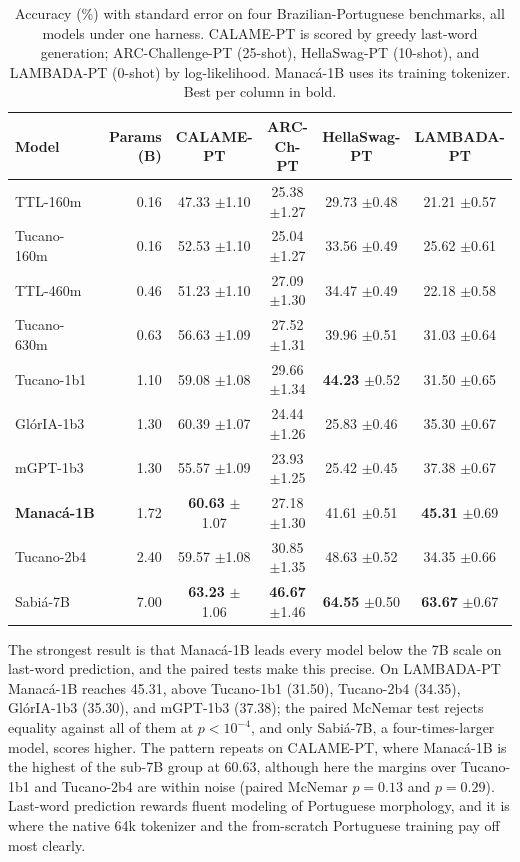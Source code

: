 \documentclass[11pt]{article}
\begin{document}
\begin{table}[t]
\centering
\caption{Accuracy (\%) with standard error on four Brazilian-Portuguese benchmarks,
all models under one harness. CALAME-PT is scored by greedy last-word generation;
ARC-Challenge-PT (25-shot), HellaSwag-PT (10-shot), and LAMBADA-PT (0-shot) by
log-likelihood. Manac\'a-1B uses its training tokenizer. Best per column in bold.}
\label{tab:main}
\small
\begin{tabular}{lrcccc}
\toprule
Model & Params (B) & CALAME-PT & ARC-Ch-PT & HellaSwag-PT & LAMBADA-PT \\
\midrule
TTL-160m       & 0.16 & 47.33 \tiny$\pm$1.10 & 25.38 \tiny$\pm$1.27 & 29.73 \tiny$\pm$0.48 & 21.21 \tiny$\pm$0.57 \\
Tucano-160m    & 0.16 & 52.53 \tiny$\pm$1.10 & 25.04 \tiny$\pm$1.27 & 33.56 \tiny$\pm$0.49 & 25.62 \tiny$\pm$0.61 \\
TTL-460m       & 0.46 & 51.23 \tiny$\pm$1.10 & 27.09 \tiny$\pm$1.30 & 34.47 \tiny$\pm$0.49 & 22.18 \tiny$\pm$0.58 \\
Tucano-630m    & 0.63 & 56.63 \tiny$\pm$1.09 & 27.52 \tiny$\pm$1.31 & 39.96 \tiny$\pm$0.51 & 31.03 \tiny$\pm$0.64 \\
Tucano-1b1     & 1.10 & 59.08 \tiny$\pm$1.08 & 29.66 \tiny$\pm$1.34 & \textbf{44.23} \tiny$\pm$0.52 & 31.50 \tiny$\pm$0.65 \\
Gl\'orIA-1b3   & 1.30 & 60.39 \tiny$\pm$1.07 & 24.44 \tiny$\pm$1.26 & 25.83 \tiny$\pm$0.46 & 35.30 \tiny$\pm$0.67 \\
mGPT-1b3       & 1.30 & 55.57 \tiny$\pm$1.09 & 23.93 \tiny$\pm$1.25 & 25.42 \tiny$\pm$0.45 & 37.38 \tiny$\pm$0.67 \\
\textbf{Manac\'a-1B} & 1.72 & \textbf{60.63} \tiny$\pm$1.07 & 27.18 \tiny$\pm$1.30 & 41.61 \tiny$\pm$0.51 & \textbf{45.31} \tiny$\pm$0.69 \\
Tucano-2b4     & 2.40 & 59.57 \tiny$\pm$1.08 & 30.85 \tiny$\pm$1.35 & 48.63 \tiny$\pm$0.52 & 34.35 \tiny$\pm$0.66 \\
Sabi\'a-7B     & 7.00 & \textbf{63.23} \tiny$\pm$1.06 & \textbf{46.67} \tiny$\pm$1.46 & \textbf{64.55} \tiny$\pm$0.50 & \textbf{63.67} \tiny$\pm$0.67 \\
\bottomrule
\end{tabular}
\end{table}

The strongest result is that Manac\'a-1B leads every model below the 7B scale on
last-word prediction, and the paired tests make this precise. On LAMBADA-PT
Manac\'a-1B reaches 45.31, above Tucano-1b1 (31.50), Tucano-2b4 (34.35),
Gl\'orIA-1b3 (35.30), and mGPT-1b3 (37.38); the paired McNemar test rejects equality
against all of them at $p<10^{-4}$, and only Sabi\'a-7B, a four-times-larger model,
scores higher. The pattern repeats on CALAME-PT, where Manac\'a-1B is the highest of
the sub-7B group at 60.63, although here the margins over Tucano-1b1 and Tucano-2b4
are within noise (paired McNemar $p=0.13$ and $p=0.29$). Last-word prediction rewards
fluent modeling of Portuguese morphology, and it is where the native 64k tokenizer
and the from-scratch Portuguese training pay off most clearly.
\end{document}
